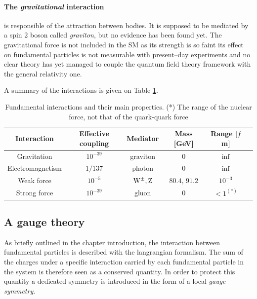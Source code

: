 \paragraph{The \emph{gravitational} interaction} is responsible of the attraction between bodies. It is supposed to be mediated by a spin 2 boson called \emph{graviton}, but no evidence has been found yet. The gravitational force is not included in the SM as its strength is so faint its effect on fundamental particles is not measurable with present--day experiments and no clear theory has yet managed to couple the quantum field theory framework with the general relativity one.

A summary of the interactions is given on Table \ref{tab:bosons}.

\begin{table}
\caption{Fundamental interactions and their main properties. (*) The range of the nuclear force, not that of the quark-quark force}
\label{tab:bosons}
\begin{center}
\begin{tabular}{ c c c c c c}
\hline
Interaction & Effective coupling & Mediator & Mass [GeV] & Range [$f$m]\\
\hline
Gravitation & $10^{-39}$ & graviton & 0 & $\inf$ \\
Electromagnetism & $1/137$ & photon & 0 & $\inf$ \\
Weak force & $10^{-5}$ & $\mathrm{W}^\pm,\mathrm{Z}$ & $80.4,\,91.2$ & $10^{-3}$ \\
Strong force & $10^{-39}$ & gluon & 0 & $<1^{(*)}$ \\
\hline
\end{tabular}
\end{center}
\end{table}

\subsection{A gauge theory}

As briefly outlined in the chapter introduction, the interaction between fundamental particles is described with the langrangian formalism. The sum of the charges under a specific interaction carried by each fundamental particle in the system is therefore seen as a conserved quantity. In order to protect this quantity a dedicated symmetry is introduced in the form of a local \emph{gauge symmetry}. 

